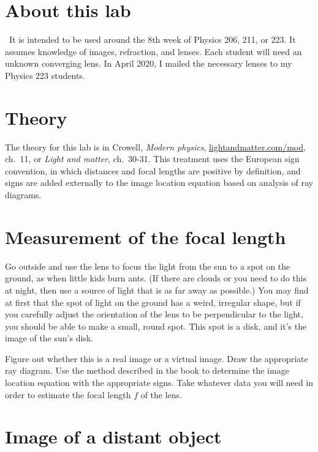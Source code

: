 \addtocounter{chapter}{-1}
\renewcommand\thechapter{c3.8a}
\label{lab:optics}

\section*{About this lab}

\covid\ 
It is intended to be used around the 8th week of Physics 206, 211, or 223.
It assumes knowledge of images, refraction, and lenses.
Each student will need an unknown converging lens. In April 2020, I mailed
the necessary lenses to my Physics 223 students.

\section{Theory}

The theory for this lab is in Crowell, \emph{Modern physics},
\url{lightandmatter.com/mod}, ch.~11, or \emph{Light and matter}, ch.~30-31. This treatment uses
the European sign convention, in which distances and focal lengths
are positive by definition, and signs are added externally to
the image location equation based on analysis of ray diagrams.

\section{Measurement of the focal length}

Go outside and use the lens to focus the light from the sun
to a spot on the ground, as when little kids burn ants. (If there
are clouds or you need to do this at night, then use a source of
light that is as far away as possible.) You may find at first that
the spot of light on the ground has a weird, irregular shape, but
if you carefully adjust the orientation of the lens to be perpendicular
to the light, you should be able to make a small, round spot. This spot
is a disk, and it's the image of the sun's disk.

Figure out whether this is a real image or a virtual image. Draw
the appropriate ray diagram. Use the method described in the book
to determine the image location equation with the appropriate signs.
Take whatever data you will need in order to estimate the focal
length $f$ of the lens.

\section{Image of a distant object}

